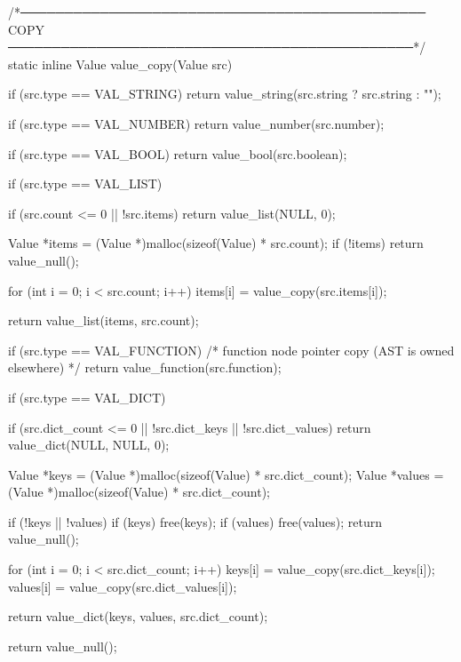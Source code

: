 \documentclass{article}
\begin{document}
/*──────────────────────────────────────────────
  COPY
──────────────────────────────────────────────*/
static inline Value value_copy(Value src)
{
    if (src.type == VAL_STRING) {
        return value_string(src.string ? src.string : "");
    }

    if (src.type == VAL_NUMBER) {
        return value_number(src.number);
    }

    if (src.type == VAL_BOOL) {
         return value_bool(src.boolean);
    }


    if (src.type == VAL_LIST) {

        if (src.count <= 0 || !src.items) {
            return value_list(NULL, 0);
        }

        Value *items = (Value *)malloc(sizeof(Value) * src.count);
        if (!items) return value_null();

        for (int i = 0; i < src.count; i++) {
            items[i] = value_copy(src.items[i]);
        }

        return value_list(items, src.count);
    }

    if (src.type == VAL_FUNCTION) {
        /* function node pointer copy (AST is owned elsewhere) */
        return value_function(src.function);
    }

    if (src.type == VAL_DICT) {

        if (src.dict_count <= 0 || !src.dict_keys || !src.dict_values) {
            return value_dict(NULL, NULL, 0);
        }

        Value *keys = (Value *)malloc(sizeof(Value) * src.dict_count);
        Value *values = (Value *)malloc(sizeof(Value) * src.dict_count);

        if (!keys || !values) {
            if (keys) free(keys);
            if (values) free(values);
            return value_null();
        }

        for (int i = 0; i < src.dict_count; i++) {
            keys[i] = value_copy(src.dict_keys[i]);
            values[i] = value_copy(src.dict_values[i]);
        }

        return value_dict(keys, values, src.dict_count);
    }

    return value_null();
}
\end{document}

